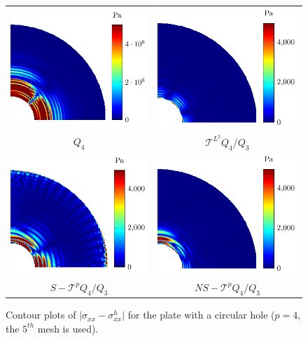 \documentclass{article}
\begin{document}
\begin{figure}[htb!]
    \center
    \begin{tabular}{cc}
    \includegraphics[width=.4\linewidth]{no} & \includegraphics[width=.4\linewidth]{g}\\
    $Q_4$ & $\mathcal{T}^{L^2} Q_4/Q_3$\\
    \includegraphics[width=.4\linewidth]{s} & \includegraphics[width=.4\linewidth]{ns}\\
    $S-\mathcal{T}^{p} Q_4/Q_3$ & $NS-\mathcal{T}^{p} Q_4/Q_3$
    \end{tabular}
        \caption{Contour plots of $\vert{\sigma_{xx}-\sigma_{xx}^h}\vert$ for the plate with a circular hole ($p=4$, the $5^{th}$ mesh is used).}
        \label{fig:platewithhole_contour}
    \end{figure}
\end{document}
